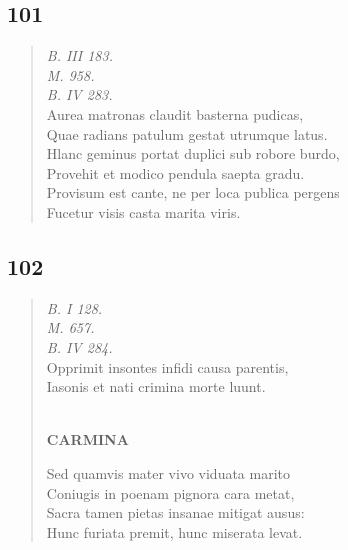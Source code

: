 \documentclass[11pt, a4paper]{report}
\begin{document}
            \subsection*{101}
      \begin{verse}
      \textit{B. III 183.} \\ \textit{M. 958.} \\ \textit{B. IV 283.} \\ Aurea matronas claudit basterna pudicas, \\ Quae radians patulum gestat utrumque latus. \\ Hlanc geminus portat duplici sub robore burdo, \\ Provehit et modico pendula saepta gradu. \\ Provisum est cante, ne per loca publica pergens \\ Fucetur visis casta marita viris. \\ 
      \end{verse}
  
            \subsection*{102}
      \begin{verse}
      \textit{B. I 128.} \\ \textit{M. 657.} \\ \textit{B. IV 284.} \\ Opprimit insontes infidi causa parentis, \\ Iasonis et nati crimina morte luunt. \\ 
        ﻿\pagebreak 
     \marginpar{[102]} \begin{center} \textbf{CARMINA} \end{center}Sed quamvis mater vivo viduata marito \\ Coniugis in poenam pignora cara metat, \\ Sacra tamen pietas insanae mitigat ausus: \\ Hunc furiata premit, hunc miserata levat. \\ 
      \end{verse}
  
\end{document}
